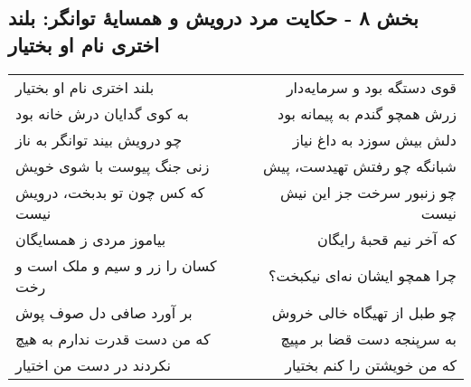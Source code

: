 \begin{center}
\section*{بخش ۸ - حکایت مرد درویش و همسایهٔ توانگر: بلند اختری نام او بختیار}
\label{sec:008}
\begin{longtable}{l p{0.5cm} r}
بلند اختری نام او بختیار
&&
قوی دستگه بود و سرمایه‌دار
\\
به کوی گدایان درش خانه بود
&&
زرش همچو گندم به پیمانه بود
\\
چو درویش بیند توانگر به ناز
&&
دلش بیش سوزد به داغ نیاز
\\
زنی جنگ پیوست با شوی خویش
&&
شبانگه چو رفتش تهیدست، پیش
\\
که کس چون تو بدبخت، درویش نیست
&&
چو زنبور سرخت جز این نیش نیست
\\
بیاموز مردی ز همسایگان
&&
که آخر نیم قحبهٔ رایگان
\\
کسان را زر و سیم و ملک است و رخت
&&
چرا همچو ایشان نه‌ای نیکبخت؟
\\
بر آورد صافی دل صوف پوش
&&
چو طبل از تهیگاه خالی خروش
\\
که من دست قدرت ندارم به هیچ
&&
به سرپنجه دست قضا بر مپیچ
\\
نکردند در دست من اختیار
&&
که من خویشتن را کنم بختیار
\\
\end{longtable}
\end{center}
